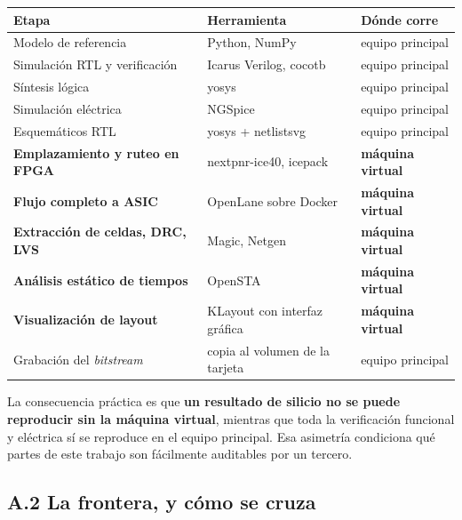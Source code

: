 \begin{longtable}[]{@{}
  >{\raggedright\arraybackslash}p{}
  >{\raggedright\arraybackslash}p{}
  >{\raggedright\arraybackslash}p{}@{}}
\toprule\noalign{}
\begin{minipage}[b]{\linewidth}\raggedright
Etapa
\end{minipage} & \begin{minipage}[b]{\linewidth}\raggedright
Herramienta
\end{minipage} & \begin{minipage}[b]{\linewidth}\raggedright
Dónde corre
\end{minipage} \\
\midrule\noalign{}
\endhead
\bottomrule\noalign{}
\endlastfoot
Modelo de referencia & Python, NumPy & equipo principal \\
Simulación RTL y verificación & Icarus Verilog, cocotb & equipo
principal \\
Síntesis lógica & yosys & equipo principal \\
Simulación eléctrica & NGSpice & equipo principal \\
Esquemáticos RTL & yosys + netlistsvg & equipo principal \\
\textbf{Emplazamiento y ruteo en FPGA} & nextpnr-ice40, icepack &
\textbf{máquina virtual} \\
\textbf{Flujo completo a ASIC} & OpenLane sobre Docker & \textbf{máquina
virtual} \\
\textbf{Extracción de celdas, DRC, LVS} & Magic, Netgen &
\textbf{máquina virtual} \\
\textbf{Análisis estático de tiempos} & OpenSTA & \textbf{máquina
virtual} \\
\textbf{Visualización de layout} & KLayout con interfaz gráfica &
\textbf{máquina virtual} \\
Grabación del \emph{bitstream} & copia al volumen de la tarjeta & equipo
principal \\
\end{longtable}

La consecuencia práctica es que \textbf{un resultado de silicio no se
puede reproducir sin la máquina virtual}, mientras que toda la
verificación funcional y eléctrica sí se reproduce en el equipo
principal. Esa asimetría condiciona qué partes de este trabajo son
fácilmente auditables por un tercero.

\subsection{A.2 La frontera, y cómo se
cruza}\label{a.2-la-frontera-y-cuxf3mo-se-cruza}

